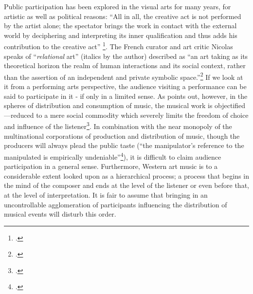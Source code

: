 Public participation has been explored in the visual arts for many years, for artistic as well as political reasons: ``All in all, the creative act is not performed by the artist alone; the spectator brings the work in contact with the external world by deciphering and interpreting its inner qualification and thus adds his contribution to the creative act'' \footcite{duchamps57}. The French curator and art critic Nicolas \citeauthor{bourriaud} speaks of ``\textit{relational} art'' (italics by the author) described as ``an art taking as its theoretical horizon the realm of human interactions and its social context, rather than the assertion of an independent and private symbolic space.''\footcite[13]{bourriaud}
If we look at it from a performing arts perspective, the audience visiting a performance can be said to participate in it - if only in a limited sense. As \citeauthor{adorno} points out, however, in the spheres of distribution and consumption of music, the musical work is objectified---reduced to a mere social commodity which severely limits the freedom of choice and influence of the listener\footcite[p. 211]{adorno}. In combination with the near monopoly of the multinational corporations of production and distribution of music, though the producers will always plead the public taste (``the manipulator's reference to the manipulated is empirically undeniable''\footcite[p. 212, my translation.]{adorno}), it is difficult to claim audience participation in a general sense. Furthermore, Western art music is to a considerable extent looked upon as a hierarchical process; a process that begins in the mind of the composer and ends at the level of the listener or even before that, at the level of interpretation. It is fair to assume that bringing in an uncontrollable agglomeration of participants influencing the distribution of musical events will disturb this order. 

